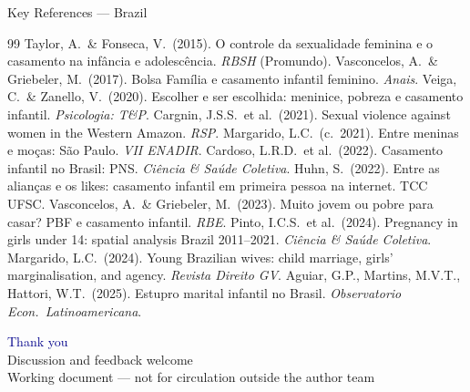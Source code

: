 \documentclass[aspectratio=169,10pt]{beamer}
\begin{document}
\begin{frame}[allowframebreaks]{Key References --- Brazil}
    \small
    \begin{thebibliography}{99}
         Taylor, A.\ \& Fonseca, V.\ (2015). O controle da sexualidade feminina e o casamento na infância e adolescência. \textit{RBSH} (Promundo).
         Vasconcelos, A.\ \& Griebeler, M.\ (2017). Bolsa Família e casamento infantil feminino. \textit{Anais}.
         Veiga, C.\ \& Zanello, V.\ (2020). Escolher e ser escolhida: meninice, pobreza e casamento infantil. \textit{Psicologia: T\&P}.
         Cargnin, J.S.S.\ et al.\ (2021). Sexual violence against women in the Western Amazon. \textit{RSP}.
         Margarido, L.C.\ (c.\ 2021). Entre meninas e moças: São Paulo. \textit{VII ENADIR}.
         Cardoso, L.R.D.\ et al.\ (2022). Casamento infantil no Brasil: PNS. \textit{Ciência \& Saúde Coletiva}.
         Huhn, S.\ (2022). Entre as alianças e os likes: casamento infantil em primeira pessoa na internet. TCC UFSC.
         Vasconcelos, A.\ \& Griebeler, M.\ (2023). Muito jovem ou pobre para casar? PBF e casamento infantil. \textit{RBE}.
         Pinto, I.C.S.\ et al.\ (2024). Pregnancy in girls under 14: spatial analysis Brazil 2011--2021. \textit{Ciência \& Saúde Coletiva}.
         Margarido, L.C.\ (2024). Young Brazilian wives: child marriage, girls' marginalisation, and agency. \textit{Revista Direito GV}.
         Aguiar, G.P., Martins, M.V.T., Hattori, W.T.\ (2025). Estupro marital infantil no Brasil. \textit{Observatorio Econ.\ Latinoamericana}.
    \end{thebibliography}
\end{frame}

\begin{frame}
    \centering
    \vspace{1.5cm}
    {\Huge \textcolor{darkblue}{Thank you}}\\[0.6cm]
    {\large Discussion and feedback welcome}\\[1.5cm]
    {\small Working document --- not for circulation outside the author team}
\end{frame}
\end{document}
